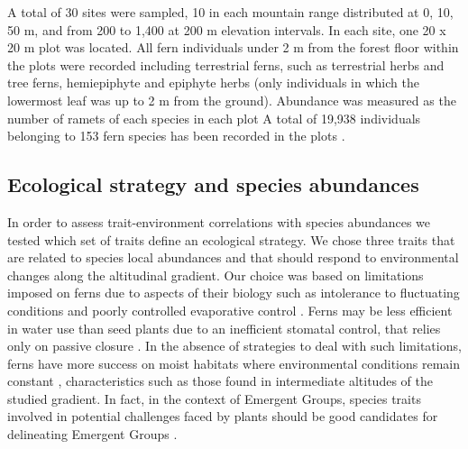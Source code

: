 \documentclass[12pt]{article}
\begin{document}
A total of 30 sites were sampled, 10 in each mountain range %
distributed at 0, 10, 50 m, and from 200 to 1,400 at 200 m elevation
intervals. In each site, one 20 x 20 m plot was
located. %
All fern individuals under 2 m from the forest floor
within the plots were recorded %
including terrestrial ferns, such as terrestrial herbs and tree ferns,
hemiepiphyte and epiphyte herbs (only individuals in which the
lowermost leaf was up to 2 m from the ground).
Abundance was measured
as the number of ramets of each species in each plot %
A total of 19,938 individuals belonging to 153 fern species has been recorded in the plots \cite{Paciencia2008}.

\subsection*{Ecological strategy and species abundances}

In order to assess trait-environment correlations with species
abundances we tested which set of traits define an ecological
strategy. We chose three traits that are related to species local
abundances and that should respond to environmental changes along the
altitudinal gradient.  Our choice was based on limitations imposed on
ferns due to aspects of their biology such as intolerance to
fluctuating conditions and poorly controlled evaporative control
\citep{Page2002}. Ferns may be less efficient in water use than seed
plants due to an inefficient stomatal control, that relies only on
passive closure \citep{Brodribb2011}.  In the absence of strategies to
deal with such limitations, ferns have more success on moist habitats
where environmental conditions remain constant \citep{Page2002},
characteristics such as those found in intermediate altitudes of the
studied gradient.  In fact, in the context of Emergent Groups, species
traits involved in potential challenges faced by plants should be good
candidates for delineating Emergent Groups \citep{Herault2007}.
\end{document}
